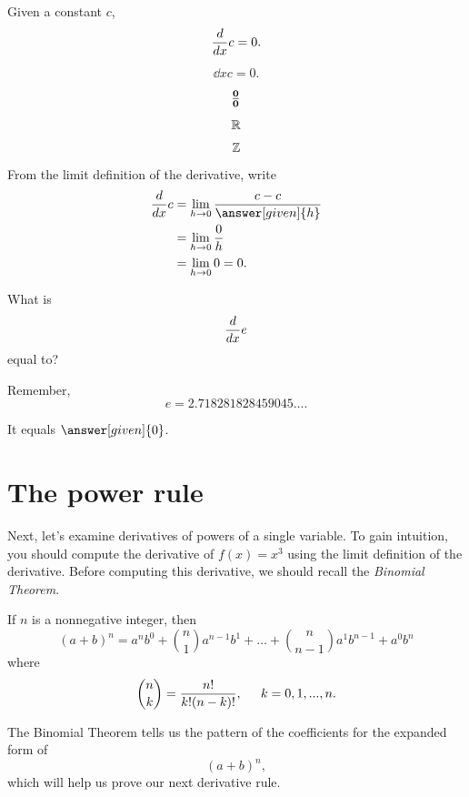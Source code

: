 \documentclass{ximera}
\begin{document}
\begin{theorem}
Given a constant $c$,
\[
 \frac{d}{\mathop{}\!d x} c = 0.
 \]
 
 \[
 \dd{x} c = 0.
 \]
 
 \[
 \boldsymbol{\tfrac{0}{0}}
 \]
 
 
  \[
 \mathbb R
 \]
 
 
 \[
 \mathbb Z
 \]
 

 
 
 \mooculus
 
 
 
 
 
 
 

\begin{explanation}
From the limit definition of the derivative, write
\begin{align*}
\ddx c &= \lim_{h\to 0}\frac{c-c}{\answer[given]{h}}\\
&= \lim_{h\to 0} \frac{0}{h}\\
&= \lim_{h\to 0} 0 = 0.
\end{align*}
\end{explanation}
\end{theorem}

\begin{question}
  What is
  \[
  \frac{d}{\mathop{}\!d x} e
  \]
  equal to?
  \begin{hint}
    Remember,
    \[
    e = 2.718281828459045\dots.
    \]
  \end{hint}
  \begin{prompt}
    It equals $\answer[given]{0}$.
  \end{prompt}
\end{question}


\section{The power rule}

Next, let's examine derivatives of powers of a single variable. 
To gain intuition, you should compute the
derivative of $f(x) = x^3$ using the limit definition of the
derivative. Before computing this derivative, we should recall 
the \textit{Binomial Theorem}.

\begin{theorem}
If $n$ is a nonnegative integer, then
\[
(a+b)^n = a^nb^0 + \binom{n}{1} a^{n-1}b^1 + \dots + \binom{n}{n-1} a^{1}b^{n-1} +  a^{0}b^n   
\]
where
\[
\binom{n}{k} = \frac{n!}{k!(n-k)!}, \hspace{0.2in}k=0,1,...,n.
\]
\end{theorem}
The Binomial Theorem tells us the pattern of the coefficients for the
expanded form of
\[
(a+b)^n,
\]
which will help us prove our next derivative rule.
\end{document}
